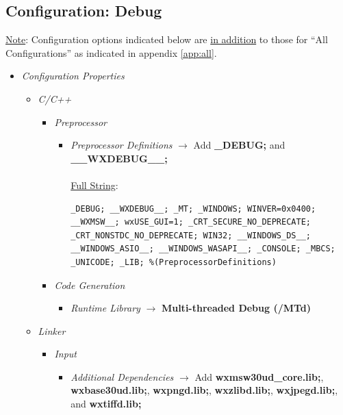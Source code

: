 \documentclass[12pt]{report}
\begin{document}
\begin{appendices}
	\section{Configuration: Debug} 
	\underline{Note}: Configuration options indicated below are \underline{in addition} to those for ``All Configurations'' as indicated in appendix \ref{app:all}.
	\begin{itemize} %
		\item \emph{Configuration Properties}
		\begin{itemize} %
			\item \emph{C/C++}
			\begin{itemize} %
				\item \emph{Preprocessor}
				\begin{itemize} %
					\item \emph{Preprocessor Definitions} $\rightarrow$ Add {\bf{\_}DEBUG;} and {\bf{\_}{\_}WXDEBUG{\_}{\_};} \\
					\\
					\underline{\scriptsize Full String}:
\begin{lstlisting}
_DEBUG; __WXDEBUG__; _MT; _WINDOWS; WINVER=0x0400; __WXMSW__; wxUSE_GUI=1; _CRT_SECURE_NO_DEPRECATE; _CRT_NONSTDC_NO_DEPRECATE; WIN32; __WINDOWS_DS__; __WINDOWS_ASIO__; __WINDOWS_WASAPI__; _CONSOLE; _MBCS; _UNICODE; _LIB; %(PreprocessorDefinitions)
\end{lstlisting}				
				\end{itemize} %
				\item \emph{Code Generation}
				\begin{itemize} %
					\item \emph{Runtime Library} $\rightarrow$ {\bf Multi-threaded Debug (/MTd)}
				\end{itemize} %
			\end{itemize} %
			\item \emph{Linker}
			\begin{itemize} %
				\item \emph{Input}
				\begin{itemize} %
					\item \emph{Additional Dependencies} $\rightarrow$ Add {\bf wxmsw30ud{\_}core.lib;}, {\bf wxbase30ud.lib;}, {\bf wxpngd.lib;}, {\bf wxzlibd.lib;}, {\bf wxjpegd.lib;}, and {\bf wxtiffd.lib;}\\

\end{itemize}
\end{itemize}
\end{itemize}
\end{itemize}
\end{appendices}
\end{document}
